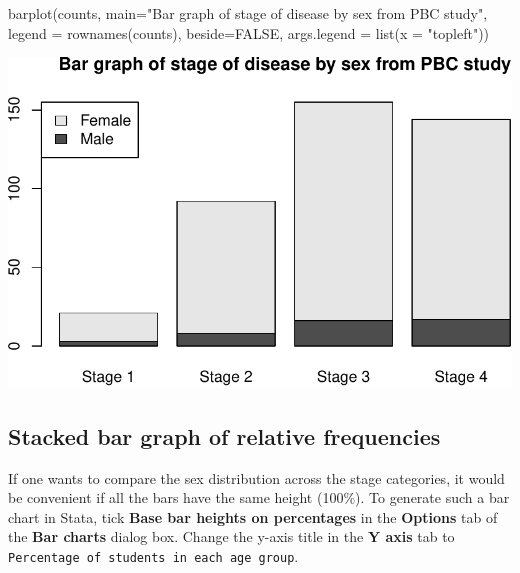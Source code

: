 \documentclass[
]{memoir}
\newenvironment{Shaded}{\begin{snugshade}}{\end{snugshade}}
\newcommand{\AttributeTok}[1]{\textcolor[rgb]{0.77,0.63,0.00}{#1}}
\newcommand{\ConstantTok}[1]{\textcolor[rgb]{0.00,0.00,0.00}{#1}}
\newcommand{\FunctionTok}[1]{\textcolor[rgb]{0.00,0.00,0.00}{#1}}
\newcommand{\NormalTok}[1]{#1}
\newcommand{\StringTok}[1]{\textcolor[rgb]{0.31,0.60,0.02}{#1}}
\begin{document}
\begin{Shaded}
\begin{Highlighting}[]
\FunctionTok{barplot}\NormalTok{(counts, }\AttributeTok{main=}\StringTok{"Bar graph of stage of disease by sex from PBC study"}\NormalTok{,}
        \AttributeTok{legend =} \FunctionTok{rownames}\NormalTok{(counts), }\AttributeTok{beside=}\ConstantTok{FALSE}\NormalTok{, }\AttributeTok{args.legend =} \FunctionTok{list}\NormalTok{(}\AttributeTok{x =} \StringTok{"topleft"}\NormalTok{))}
\end{Highlighting}
\end{Shaded}

\includegraphics{01-IntroToR_files/figure-latex/unnamed-chunk-36-1.pdf}

\hypertarget{stacked-bar-graph-of-relative-frequencies}{%
\subsection{Stacked bar graph of relative frequencies}\label{stacked-bar-graph-of-relative-frequencies}}

If one wants to compare the sex distribution across the stage categories, it would be convenient if all the bars have the same height (100\%). To generate such a bar chart in Stata, tick \textbf{Base bar heights on percentages} in the \textbf{Options} tab of the \textbf{Bar charts} dialog box. Change the y-axis title in the \textbf{Y axis} tab to \texttt{Percentage\ of\ students\ in\ each\ age\ group}.
\end{document}
